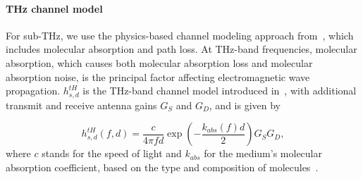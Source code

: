 \paragraph{THz channel model}
\label{sub:thzchannel}
%
%
For sub-THz, we use the physics-based channel modeling approach from~\cite{5995306}, which includes molecular absorption and path loss.
At THz-band frequencies, molecular absorption, which causes both molecular absorption loss and molecular absorption noise, is the principal factor affecting electromagnetic wave propagation. $h_{s, d}^{tH}$ is the THz-band channel model introduced in~\cite{5995306}, with additional transmit and receive antenna gains $G_S$ and $G_D$, and is given by
%

\begin{equation}
h_{s, d}^{tH}(f,d)=  \frac{c}{4 \pi f d} \exp \left( -\frac{k_{abs}(f)d}{2} \right)  G_{S}  G_{D} ,
\label{EQ_PHY}
\end{equation}
%
where $c$ stands for the speed of light and $k_{abs}$ for the medium's molecular absorption coefficient, based on the type and composition of molecules~\cite{hossain2018terasim}.

